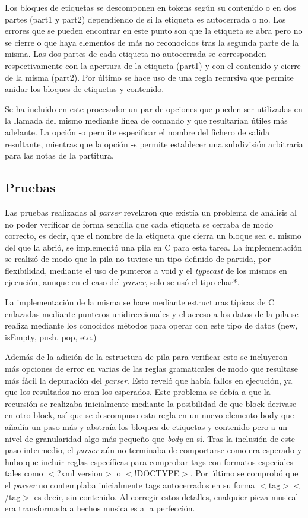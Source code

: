 Los bloques de etiquetas se descomponen en tokens según su contenido o en dos partes (part1 y part2) dependiendo de si la etiqueta es autocerrada o no. Los errores que se pueden encontrar en este punto son que la etiqueta se abra pero no se cierre o que haya elementos de más no reconocidos tras la segunda parte de la misma. Las dos partes de cada etiqueta no autocerrada se corresponden respectivamente con la apertura de la etiqueta (part1) y con el contenido y cierre de la misma (part2). Por último se hace uso de una regla recursiva que permite anidar los bloques de etiquetas y contenido.

Se ha incluido en este procesador un par de opciones que pueden ser utilizadas en la llamada del mismo mediante línea de comando y que resultarían útiles más adelante. La opción -o permite especificar el nombre del fichero de salida resultante, mientras que la opción -s permite establecer una subdivisión arbitraria para las notas de la partitura.

\subsection{Pruebas}
Las pruebas realizadas al \textit{parser} revelaron que existía un problema de análisis al no poder verificar de forma sencilla que cada etiqueta se cerraba de modo correcto, es decir, que el nombre de la etiqueta que cierra un bloque sea el mismo del que la abrió, se implementó una pila en C para esta tarea. La implementación se realizó de modo que la pila no tuviese un tipo definido de partida, por flexibilidad, mediante el uso de punteros a void y el \textit{typecast} de los mismos en ejecución, aunque en el caso del \textit{parser}, solo se usó el tipo char*.

La implementación de la misma se hace mediante estructuras típicas de C enlazadas mediante punteros unidireccionales y el acceso a los datos de la pila se realiza mediante los conocidos métodos para operar con este tipo de datos (new, isEmpty, push, pop, etc.) 

Además de la adición de la estructura de pila para verificar esto se incluyeron más opciones de error en varias de las reglas gramaticales de modo que resultase más fácil la depuración del \textit{parser}. Esto reveló que había fallos en ejecución, ya que los resultados no eran los esperados. Este problema se debía a que la recursión se realizaba inicialmente mediante la posibilidad de que block derivase en otro block, así que se descompuso esta regla en un nuevo elemento body que añadía un paso más y abstraía los bloques de etiquetas y contenido pero a un nivel de granularidad algo más pequeño que \textit{body} en sí. Tras la inclusión de este paso intermedio, el \textit{parser} aún no terminaba de comportarse como era esperado y hubo que incluir reglas específicas para comprobar tags con formatos especiales tales como $<$?xml version$>$ o $<$!DOCTYPE$>$. Por último se comprobó que el \textit{parser} no contemplaba inicialmente tags autocerrados en su forma $<$tag$>$$<$/tag$>$ es decir, sin contenido. Al corregir estos detalles, cualquier pieza musical era transformada a hechos musicales a la perfección.

